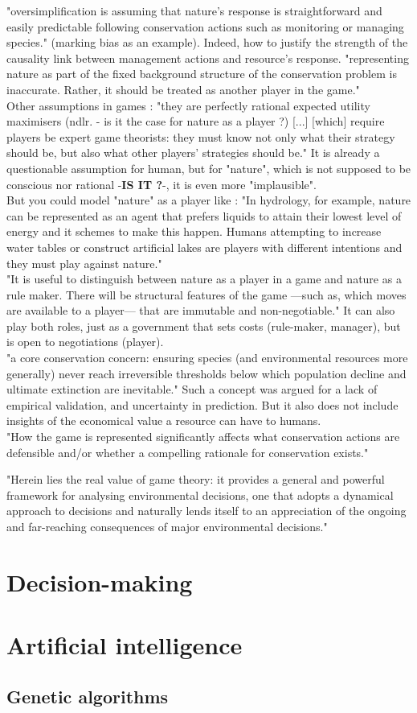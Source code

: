 \documentclass[12pt]{article}
\begin{document}
"oversimplification is assuming that nature’s response is straightforward and easily predictable following conservation actions such as monitoring or managing species." (marking bias as an example). Indeed, how to justify the strength of the causality link between management actions and resource's response.
"representing nature as part of the fixed background structure of the
conservation problem is inaccurate. Rather, it should be treated
as another player in the game."\\
Other assumptions in games : "they are perfectly rational
expected utility maximisers (ndlr. - is it the case for nature as a player ?) [...] [which] require players be expert game theorists: they must know
not only what their strategy should be, but also what other players’
strategies should be." It is already a questionable assumption for human, but for "nature", which is not supposed to be conscious nor rational -\textbf{IS IT ?}-, it is even more "implausible".\\
But you could model "nature" as a player like : "In hydrology, for example, nature
can be represented as an agent that prefers liquids to attain their
lowest level of energy and it schemes to make this happen. Humans attempting to increase water tables or construct artificial lakes are players
with different intentions and they must play against nature."\\
"It is useful to distinguish between nature as a player in a game
and nature as a rule maker. There will be structural features of the
game —such as, which moves are available to a player— that are
immutable and non-negotiable." It can also play both roles, just as a government that sets costs (rule-maker, manager), but is open to negotiations (player).\\
"a core conservation
concern: ensuring species (and environmental resources more generally) never reach irreversible thresholds below which population
decline and ultimate extinction are inevitable." Such a concept was argued for a lack of empirical validation, and uncertainty in prediction. But it also does not include insights of the economical value a resource can have to humans.\\

"How the game is represented significantly affects what conservation actions are defensible and/or whether a compelling rationale for conservation exists."

"Herein lies
the real value of game theory: it provides a general and powerful
framework for analysing environmental decisions, one that
adopts a dynamical approach to decisions and naturally lends itself to an appreciation of the ongoing and far-reaching consequences of major environmental decisions."

\section{Decision-making}

\section{Artificial intelligence}

\subsection{Genetic algorithms}

\newpage

\nocite{*}
\end{document}
